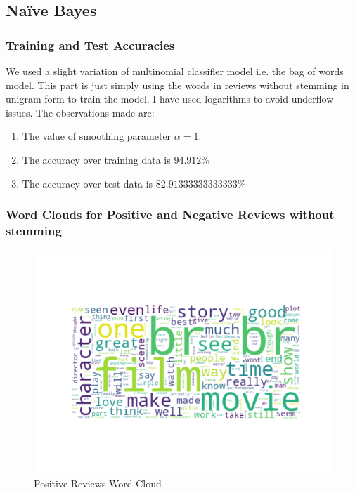 \documentclass[11pt]{article}
\begin{document}
\subsection{Na\"{i}ve Bayes}
\subsubsection{Training and Test Accuracies}
We used a slight variation of multinomial classifier model i.e. the bag of words model. This part is just simply using the words in reviews without stemming in unigram form to train the model. I have used logarithms to avoid underflow issues. The observations made are:
\begin{enumerate}
  \item The value of smoothing parameter $\alpha = 1$.
  \item The accuracy over training data is $94.912\%$
  \item The accuracy over test data is $82.91333333333333\%$
\end{enumerate}

\subsubsection{Word Clouds for Positive and Negative Reviews without stemming}

\begin{figure}[H]
  \includegraphics[width=\linewidth]{PositiveWordCloud.png}
  \caption{Positive Reviews Word Cloud}
  \label{fig1A}
\end{figure}
\end{document}
